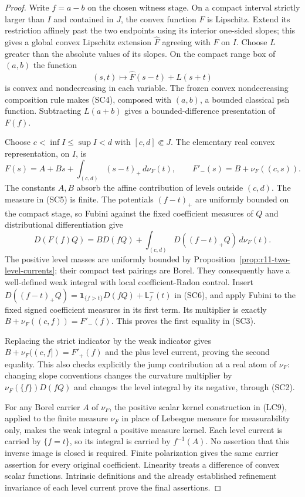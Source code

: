 \begin{proof}
Write $f=a-b$ on the chosen witness stage.  On a compact interval
strictly larger than $I$ and contained in $J$, the convex function
$F$ is Lipschitz.  Extend its restriction affinely past the two
endpoints using its interior one-sided slopes; this gives a global
convex Lipschitz extension $\widehat F$ agreeing with $F$ on $I$.
Choose $L$ greater than the absolute values of its slopes.  On the
compact range box of $(a,b)$ the function
\[
                  (s,t)\longmapsto\widehat F(s-t)+L(s+t)
 \tag{SC4}
\]
is convex and nondecreasing in each variable.  The frozen
convex nondecreasing composition rule makes (SC4), composed
with $(a,b)$, a bounded classical psh function.  Subtracting
$L(a+b)$ gives a bounded-difference presentation of $F(f)$.

Choose $c<\inf I\leq\sup I<d$ with $[c,d]\Subset J$.
The elementary real convex representation, on $I$, is
\[
 F(s)=A+Bs+\int_{(c,d)}(s-t)_+\,d\nu_F(t),\qquad
 F'_-(s)=B+\nu_F((c,s)).
 \tag{SC5}
\]
The constants $A,B$ absorb the affine contribution of levels
outside $(c,d)$.  The measure in (SC5) is finite.  The
potentials $(f-t)_+$ are uniformly bounded on the compact
stage, so Fubini against the fixed coefficient measures of
$Q$ and distributional differentiation give
\[
 D(F(f)Q)=B D(fQ)
           +\int_{(c,d)}D((f-t)_+Q)\,d\nu_F(t).
 \tag{SC6}
\]
The positive level masses are uniformly bounded by
Proposition~\ref{prop:r11-two-level-currents}; their compact
test pairings are Borel.  They consequently have a well-defined
weak integral with local coefficient-Radon control.  Insert
$D((f-t)_+Q)=\mathbf1_{\{f>t\}}D(fQ)+\mathsf L_f^-(t)$
in (SC6), and apply Fubini to the fixed signed coefficient
measures in its first term.  Its multiplier is exactly
$B+\nu_F((c,f))=F'_-(f)$.  This proves the first equality
in (SC3).

Replacing the strict indicator by the weak indicator gives
$B+\nu_F((c,f])=F'_+(f)$ and the plus level current, proving
the second equality.  This also checks explicitly the jump
contribution at a real atom of $\nu_F$: changing slope
conventions changes the curvature multiplier by
$\nu_F(\{f\})D(fQ)$ and changes the level integral by its
negative, through (SC2).

For any Borel carrier $A$ of $\nu_F$, the positive scalar
kernel construction in (LC9), applied to the finite measure
$\nu_F$ in place of Lebesgue measure for measurability only,
makes the weak integral a positive measure kernel.  Each level
current is carried by $\{f=t\}$, so its integral is carried
by $f^{-1}(A)$.  No assertion that this inverse image is
closed is required.  Finite polarization gives the same
carrier assertion for every original coefficient.
Linearity treats a difference of convex scalar functions.
Intrinsic definitions and the already established refinement
invariance of each level current prove the final assertions.
\end{proof}

